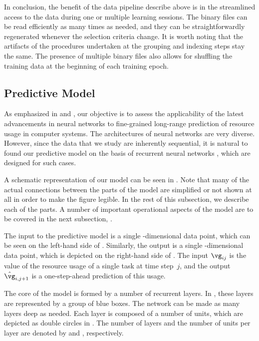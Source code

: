 In conclusion, the benefit of the data pipeline describe above is in the
streamlined access to the data during one or multiple learning sessions. The
binary files can be read efficiently as many times as needed, and they can be
straightforwardly regenerated whenever the selection criteria change. It is
worth noting that the artifacts of the procedures undertaken at the grouping and
indexing steps stay the same. The presence of multiple binary files also allows
for shuffling the training data at the beginning of each training epoch.

\subsection{Predictive Model}

As emphasized in  and , our
objective is to assess the applicability of the latest advancements in neural
networks \cite{goodfellow2016} to fine-grained long-range prediction of resource
usage in computer systems. The architectures of neural networks are very
diverse. However, since the data that we study are inherently sequential, it is
natural to found our predictive model on the basis of recurrent neural networks
\cite{goodfellow2016}, which are designed for such cases.

A schematic representation of our model can be seen in
. Note that many of the actual connections between
the parts of the model are simplified or not shown at all in order to make the
figure legible. In the rest of this subsection, we describe each of the parts. A
number of important operational aspects of the model are to be covered in the
next subsection, .

The input to the predictive model is a single \ng-dimensional data point, which
can be seen on the left-hand side of . Similarly,
the output is a single \ng-dimensional data point, which is depicted on the
right-hand side of . The input $\vg_{ij}$ is the
value of the resource usage of a single task at time step~$j$, and the output
$\hat{\vg}_{i, j + 1}$ is a one-step-ahead prediction of this usage.

The core of the model is formed by a number of recurrent layers. In
, these layers are represented by a group of blue
boxes. The network can be made as many layers deep as needed. Each layer is
composed of a number of units, which are depicted as double circles in
. The number of layers and the number of units per
layer are denoted by \nl and \nu, respectively.

